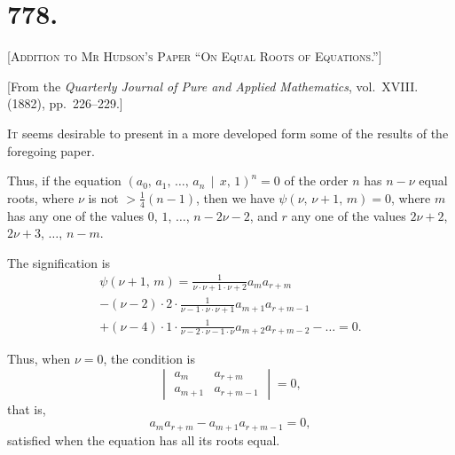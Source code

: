 \documentclass[11pt,a4paper]{article}
\theoremstyle{cayley}
\begin{document}
\newpage

\section*{778.}

\begin{center}
\Large\scshape [Addition to Mr Hudson's Paper ``On Equal Roots of Equations.'']
\end{center}

\begin{center}
[From the \textit{Quarterly Journal of Pure and Applied Mathematics}, vol.~XVIII. (1882), pp.~226--229.]
\end{center}

\textsc{It} seems desirable to present in a more developed form some of the results of the foregoing paper.

Thus, if the equation $(a_{0},\, a_{1},\, \dots,\, a_{n} \,\!\!\mid\!\!\, x,\, 1)^{n} = 0$ of the order $n$ has $n-\nu$ equal roots, where $\nu$ is not $> \frac{1}{4}(n-1)$, then we have $\psi(\nu,\, \nu+1,\, m) = 0$, where $m$ has any one of the values $0$, $1$, $\dots$, $n-2\nu-2$, and $r$ any one of the values $2\nu+2$, $2\nu+3$, $\dots$, $n-m$.

The signification is
\begin{multline*}
\psi(\nu+1,\, m) = \frac{1}{\nu \cdot \nu+1 \cdot \nu+2} a_{m}a_{r+m} \\
- (\nu-2) \cdot 2 \cdot \frac{1}{\nu-1 \cdot \nu \cdot \nu+1} a_{m+1}a_{r+m-1} \\
+ (\nu-4) \cdot 1 \cdot \frac{1}{\nu-2 \cdot \nu-1 \cdot \nu} a_{m+2}a_{r+m-2} - \dots = 0.
\end{multline*}

Thus, when $\nu=0$, the condition is
\[
\begin{vmatrix}
a_{m} & a_{r+m} \\
a_{m+1} & a_{r+m-1}
\end{vmatrix} = 0,
\]
that is,
\[
a_{m}a_{r+m} - a_{m+1}a_{r+m-1} = 0,
\]
satisfied when the equation has all its roots equal.
\end{document}
